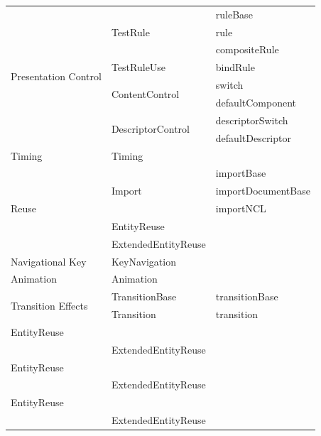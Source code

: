 \begin{table}[h]
{\begin{tabular}{|p{4.5cm}|p{6cm}|p{4cm}|}
  \multirow{8}{*}{Presentation Control} & \multirow{3}{*}{TestRule} & ruleBase\\\cline{3-3}
  && rule\\\cline{3-3} && compositeRule\\\cline{2-3} &
  TestRuleUse & bindRule\\\cline{2-3} &
  \multirow{2}{*}{ContentControl} & switch\\\cline{3-3} &&
  defaultComponent\\\cline{2-3} &
  \multirow{2}{*}{DescriptorControl} & descriptorSwitch\\\cline{3-3} &&
  defaultDescriptor\\\hline
  
  Timing &  Timing & \\\hline
  
  \multirow{5}{*}{Reuse} & \multirow{3}{*}{Import} & importBase\\\cline{3-3}
  && importDocumentBase\\\cline{3-3} && importNCL\\\cline{2-3} &
  EntityReuse &\\\cline{2-3} & ExtendedEntityReuse &\\\hline
  
  Navigational Key &  KeyNavigation & \\\hline 
  
  Animation &  Animation & \\\hline 
 
   \multirow{2}{*}{Transition Effects} & TransitionBase & transitionBase\\\cline{2-3}
  & Transition & transition\\\hline
  
  EntityReuse &\\\cline{2-3} & ExtendedEntityReuse &\\\hline
   EntityReuse &\\\cline{2-3} & ExtendedEntityReuse &\\\hline
   EntityReuse &\\\cline{2-3} & ExtendedEntityReuse &\\\hline
 
  \end{tabular}
}
\end{table}
